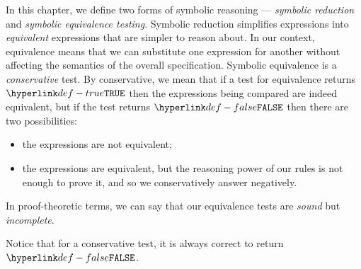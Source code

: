 \documentclass{book}
\begin{document}
In this chapter, we define two forms of symbolic reasoning ---
\emph{symbolic reduction} and \emph{symbolic equivalence testing}.
Symbolic reduction simplifies expressions into \emph{equivalent} expressions
that are simpler to reason about.
In our context, equivalence means that we can substitute one expression for another without
affecting the semantics of the overall specification.
%
Symbolic equivalence is a \emph{conservative} test.
By conservative, we mean that if a test for equivalence returns $\True$ then the expressions
being compared are indeed equivalent, but if the test returns $\False$ then
there are two possibilities:
\begin{itemize}
  \item the expressions are not equivalent;
  \item the expressions are equivalent, but the reasoning power of our rules
  is not enough to prove it, and so we conservatively answer negatively.
\end{itemize}
In proof-theoretic terms, we can say that our equivalence tests are \emph{sound} but \emph{incomplete}.

Notice that for a conservative test, it is always correct to return $\False$.
\end{document}
